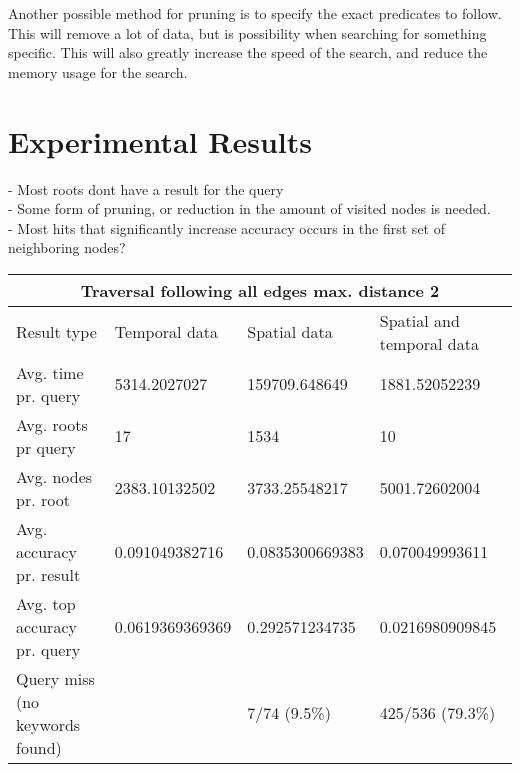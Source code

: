 Another possible method for pruning is to specify the exact predicates to follow. This will remove a lot of data, but is possibility when searching for something specific. This will also greatly increase the speed of the search, and reduce the memory usage for the search.


\section{Experimental Results}
\label{sec:experimentalResults}

- Most roots dont have a result for the query\\
- Some form of pruning, or reduction in the amount of visited nodes is needed.\\
- Most hits that significantly increase accuracy occurs in the first set of neighboring nodes?\\

\begin{tabular}{ |p{3cm}||p{3cm}|p{3cm}|p{3cm}|  }
	\hline
	\multicolumn{4}{|c|}{Traversal following all edges max. distance 2}                            \\
	\hline
	Result type                    & Temporal data   & Spatial data    & Spatial and temporal data \\
	\hline
	Avg. time pr. query            & 5314.2027027    & 159709.648649   & 1881.52052239             \\
	Avg. roots pr query            & 17              & 1534            & 10                        \\
	Avg. nodes pr. root            & 2383.10132502   & 3733.25548217   & 5001.72602004             \\
	Avg. accuracy pr. result       & 0.091049382716  & 0.0835300669383 & 0.070049993611            \\
	Avg. top accuracy pr. query    & 0.0619369369369 & 0.292571234735  & 0.0216980909845           \\
	Query miss (no keywords found) &                 & 7/74 (9.5\%)    & 425/536 (79.3\%)          \\
	\hline
\end{tabular}

